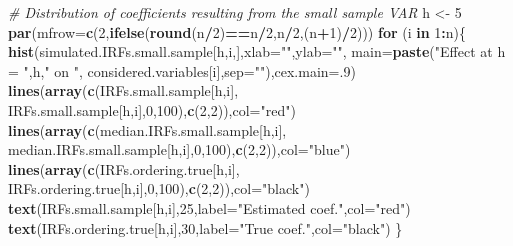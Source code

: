 \documentclass[
  12pt,
]{book}
\newenvironment{Shaded}{\begin{snugshade}}{\end{snugshade}}
\newcommand{\AttributeTok}[1]{\textcolor[rgb]{0.13,0.29,0.53}{#1}}
\newcommand{\CommentTok}[1]{\textcolor[rgb]{0.56,0.35,0.01}{\textit{#1}}}
\newcommand{\ControlFlowTok}[1]{\textcolor[rgb]{0.13,0.29,0.53}{\textbf{#1}}}
\newcommand{\DecValTok}[1]{\textcolor[rgb]{0.00,0.00,0.81}{#1}}
\newcommand{\FunctionTok}[1]{\textcolor[rgb]{0.13,0.29,0.53}{\textbf{#1}}}
\newcommand{\NormalTok}[1]{#1}
\newcommand{\OtherTok}[1]{\textcolor[rgb]{0.56,0.35,0.01}{#1}}
\newcommand{\SpecialCharTok}[1]{\textcolor[rgb]{0.81,0.36,0.00}{\textbf{#1}}}
\newcommand{\StringTok}[1]{\textcolor[rgb]{0.31,0.60,0.02}{#1}}
\theoremstyle{definition}
\theoremstyle{definition}
\theoremstyle{definition}
\theoremstyle{definition}
\theoremstyle{remark}
\begin{document}
\begin{Shaded}
\begin{Highlighting}[]
\CommentTok{\# Distribution of coefficients resulting from the small sample VAR}
\NormalTok{h }\OtherTok{\textless{}{-}} \DecValTok{5}
\FunctionTok{par}\NormalTok{(}\AttributeTok{mfrow=}\FunctionTok{c}\NormalTok{(}\DecValTok{2}\NormalTok{,}\FunctionTok{ifelse}\NormalTok{(}\FunctionTok{round}\NormalTok{(n}\SpecialCharTok{/}\DecValTok{2}\NormalTok{)}\SpecialCharTok{==}\NormalTok{n}\SpecialCharTok{/}\DecValTok{2}\NormalTok{,n}\SpecialCharTok{/}\DecValTok{2}\NormalTok{,(n}\SpecialCharTok{+}\DecValTok{1}\NormalTok{)}\SpecialCharTok{/}\DecValTok{2}\NormalTok{)))}
\ControlFlowTok{for}\NormalTok{ (i }\ControlFlowTok{in} \DecValTok{1}\SpecialCharTok{:}\NormalTok{n)\{}
  \FunctionTok{hist}\NormalTok{(simulated.IRFs.small.sample[h,i,],}\AttributeTok{xlab=}\StringTok{""}\NormalTok{,}\AttributeTok{ylab=}\StringTok{""}\NormalTok{,}
       \AttributeTok{main=}\FunctionTok{paste}\NormalTok{(}\StringTok{"Effect at h = "}\NormalTok{,h,}\StringTok{" on "}\NormalTok{,}
\NormalTok{                  considered.variables[i],}\AttributeTok{sep=}\StringTok{""}\NormalTok{),}\AttributeTok{cex.main=}\NormalTok{.}\DecValTok{9}\NormalTok{)}
  \FunctionTok{lines}\NormalTok{(}\FunctionTok{array}\NormalTok{(}\FunctionTok{c}\NormalTok{(IRFs.small.sample[h,i],}
\NormalTok{                IRFs.small.sample[h,i],}\DecValTok{0}\NormalTok{,}\DecValTok{100}\NormalTok{),}\FunctionTok{c}\NormalTok{(}\DecValTok{2}\NormalTok{,}\DecValTok{2}\NormalTok{)),}\AttributeTok{col=}\StringTok{"red"}\NormalTok{)}
  \FunctionTok{lines}\NormalTok{(}\FunctionTok{array}\NormalTok{(}\FunctionTok{c}\NormalTok{(median.IRFs.small.sample[h,i],}
\NormalTok{                median.IRFs.small.sample[h,i],}\DecValTok{0}\NormalTok{,}\DecValTok{100}\NormalTok{),}\FunctionTok{c}\NormalTok{(}\DecValTok{2}\NormalTok{,}\DecValTok{2}\NormalTok{)),}\AttributeTok{col=}\StringTok{"blue"}\NormalTok{)}
  \FunctionTok{lines}\NormalTok{(}\FunctionTok{array}\NormalTok{(}\FunctionTok{c}\NormalTok{(IRFs.ordering.true[h,i],}
\NormalTok{                IRFs.ordering.true[h,i],}\DecValTok{0}\NormalTok{,}\DecValTok{100}\NormalTok{),}\FunctionTok{c}\NormalTok{(}\DecValTok{2}\NormalTok{,}\DecValTok{2}\NormalTok{)),}\AttributeTok{col=}\StringTok{"black"}\NormalTok{)}
  \FunctionTok{text}\NormalTok{(IRFs.small.sample[h,i],}\DecValTok{25}\NormalTok{,}\AttributeTok{label=}\StringTok{"Estimated coef."}\NormalTok{,}\AttributeTok{col=}\StringTok{"red"}\NormalTok{)}
  \FunctionTok{text}\NormalTok{(IRFs.ordering.true[h,i],}\DecValTok{30}\NormalTok{,}\AttributeTok{label=}\StringTok{"True coef."}\NormalTok{,}\AttributeTok{col=}\StringTok{"black"}\NormalTok{)}
\NormalTok{\}}
\end{Highlighting}
\end{Shaded}
\end{document}
